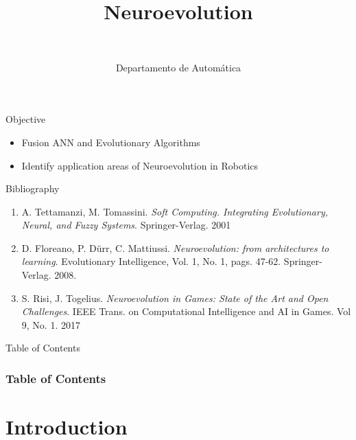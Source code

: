 \documentclass[10pt,compress]{beamer} %
\title[Neuroevolution]{Neuroevolution}
\author{\asignatura\\\carrera}
\institute{}
\date{Departamento de Automática}
\begin{document}
{\titlepageBlue
    \begin{frame}
        \titlepage
    \end{frame}
}

\begin{frame}[plain]{}
   \begin{block}{Objective}
      \begin{itemize}
        \item Fusion ANN and Evolutionary Algorithms
        \item Identify application areas of Neuroevolution in Robotics
      \end{itemize}
   \end{block}

   \begin{block}{Bibliography}
      \begin{enumerate}
        \item A. Tettamanzi, M. Tomassini. \textit{Soft Computing. Integrating Evolutionary, Neural, and Fuzzy Systems}. Springer-Verlag. 2001
        \item D. Floreano, P. D\"urr, C. Mattiussi. \textit{Neuroevolution: from architectures to learning}. Evolutionary Intelligence, Vol. 1, No. 1, pags. 47-62. Springer-Verlag. 2008.
        \item S. Risi, J. Togelius. \textit{Neuroevolution in Games: State of the Art and Open Challenges}. IEEE Trans. on Computational Intelligence and AI in Games. Vol 9, No. 1. 2017
      \end{enumerate} 
   \end{block}
\end{frame}

{
\begin{frame}[shrink]{Table of Contents}
 \frametitle{Table of Contents}
 \tableofcontents
\end{frame}
}

\section{Introduction}
\end{document}
